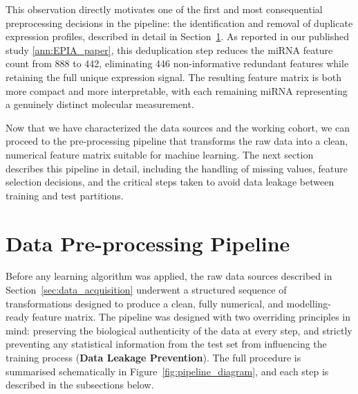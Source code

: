 This observation directly motivates one of the first and most consequential
preprocessing decisions in the pipeline: the identification and removal of
duplicate expression profiles, described in detail in
Section~\ref{sec:preprocessing}. As reported in our published study
\ref{ann:EPIA_paper}, this deduplication step reduces the miRNA feature count from
888 to 442, eliminating 446 non-informative redundant features while retaining
the full unique expression signal. The resulting feature matrix is both more
compact and more interpretable, with each remaining miRNA representing a
genuinely distinct molecular measurement.

Now that we have characterized the data sources and the working cohort, 
we can proceed to the pre-processing pipeline that transforms the raw data 
into a clean, numerical feature matrix suitable for machine learning. The next 
section describes this pipeline in detail, including the handling of missing 
values, feature selection decisions, and the critical steps taken to avoid 
data leakage between training and test partitions.

\FloatBarrier

\section{Data Pre-processing Pipeline}
\label{sec:preprocessing}

Before any learning algorithm was applied, the raw data sources described in
Section~\ref{sec:data_acquisition} underwent a structured sequence of
transformations designed to produce a clean, fully numerical, and
modelling-ready feature matrix. The pipeline was designed with two overriding
principles in mind: preserving the biological authenticity of the data at every
step, and strictly preventing any statistical information from the test set from
influencing the training process (\textbf{Data Leakage Prevention}). The full procedure is summarised
schematically in Figure~\ref{fig:pipeline_diagram}, and each step is described
in the subsections below.

